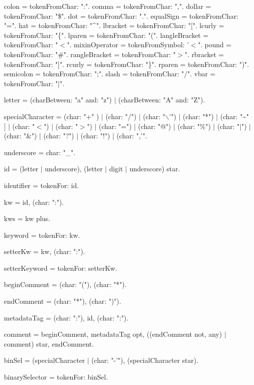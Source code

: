 \documentclass{article}
\begin{document}
\begin{newspeak}  
  
 colon =  tokenFromChar: ":".
 comma =  tokenFromChar: ",".
 dollar = tokenFromChar: "\$".
 dot = tokenFromChar: ".".
 equalSign = tokenFromChar: "=".
 hat = tokenFromChar: "\^{}".
 lbracket = tokenFromChar: "[".
 lcurly = tokenFromChar: "\{".
 lparen = tokenFromChar: "(".
 langleBracket = tokenFromChar: "$<$".
 mixinOperator = tokenFromSymbol: '$<$".
 pound = tokenFromChar: "\#".
 rangleBracket = tokenFromChar: "$>$".
 rbracket = tokenFromChar: "]".
 rcurly = tokenFromChar: "\}".
 rparen = tokenFromChar: ")".
 semicolon = tokenFromChar: ";".
 slash = tokenFromChar: "/".
 vbar = tokenFromChar: "$|$".
                                                                                                       
 letter =  (charBetween: "a" and: "z") $|$ (charBetween: "A" and: "Z").
                                                             
  specialCharacter =  (char: "+" )  $|$ (char: "/") $|$  (char: "$\backslash$'") $|$ (char: "*")   $|$ (char: "\~{}" ] $|$ 
                                       (char: "$<$") $|$ (char: "$>$") $|$ (char: "=") $|$ (char: "@")  $|$ (char: "\%") $|$ 
                                     (char: "$|$")  $|$ (char: "\&") $|$ (char: "?")  $|$ (char: "!") $|$  (char: ",'".      
                                     
 underscore = char: "\_".                                                       

 id = (letter $|$ underscore),  (letter $|$ digit $|$ underscore) star.
                                           
 identifier =  tokenFor: id.

 kw = id, (char: ":"). 

 kws = kw plus.   
  
 keyword = tokenFor: kw. 

 setterKw = kw, (char: ":"). 

 setterKeyword = tokenFor: setterKw.  

 beginComment =  (char: "("), (char: "*").

 endComment = (char: "*"),  (char: ")").
 
 metadataTag = (char: ":"), id, (char: ":").
 
 comment = beginComment,  metadataTag opt, ((endComment not, any) $|$ comment) star,	endComment.
 
 binSel =  (specialCharacter $|$ (char: "-'"), (specialCharacter star).
                                           
 binarySelector = tokenFor: binSel.
\end{newspeak}
\end{document}
